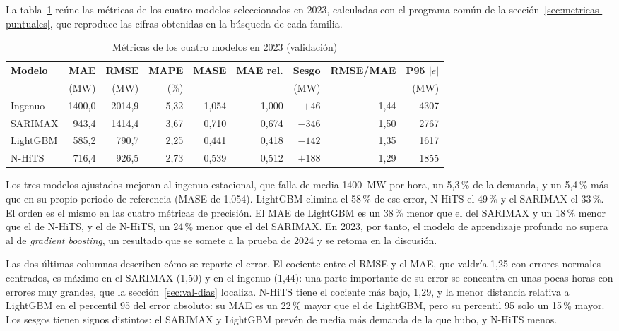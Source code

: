 La tabla~\ref{tab:validacion} reúne las métricas de los cuatro modelos
seleccionados en 2023, calculadas con el programa común de la
sección~\ref{sec:metricas-puntuales}, que reproduce las cifras obtenidas en
la búsqueda de cada familia.

\begin{table}[htbp]
	\centering
	\caption{Métricas de los cuatro modelos en 2023 (validación)}
	\label{tab:validacion}
	\small
	\setlength{\tabcolsep}{3.5pt}
	\begin{tabular}{lrrrrrrrr}
		\hline
		\textbf{Modelo} & \textbf{MAE} & \textbf{RMSE} & \textbf{MAPE} & \textbf{MASE} & \textbf{MAE rel.} & \textbf{Sesgo} & \textbf{RMSE/MAE} & \textbf{P95 $|e|$} \\
		 & (MW) & (MW) & (\%) & & & (MW) & & (MW) \\
		\hline
		Ingenuo & 1400,0 & 2014,9 & 5,32 & 1,054 & 1,000 & $+46$ & 1,44 & 4307 \\
		SARIMAX & 943,4 & 1414,4 & 3,67 & 0,710 & 0,674 & $-346$ & 1,50 & 2767 \\
		LightGBM & 585,2 & 790,7 & 2,25 & 0,441 & 0,418 & $-142$ & 1,35 & 1617 \\
		N-HiTS & 716,4 & 926,5 & 2,73 & 0,539 & 0,512 & $+188$ & 1,29 & 1855 \\
		\hline
	\end{tabular}
\end{table}

Los tres modelos ajustados mejoran al ingenuo estacional, que falla de media
1400~MW por hora, un 5,3\,\% de la demanda, y un 5,4\,\% más que en su
propio periodo de referencia (MASE de 1,054). LightGBM elimina el 58\,\% de
ese error, N-HiTS el 49\,\% y el SARIMAX el 33\,\%. El orden es el mismo en
las cuatro métricas de precisión. El MAE de LightGBM es un 38\,\% menor que el
del SARIMAX y un 18\,\% menor que el de N-HiTS, y el de N-HiTS, un 24\,\%
menor que el del SARIMAX. En 2023, por tanto, el
modelo de aprendizaje profundo no supera al de \textit{gradient boosting}, un
resultado que se somete a la prueba de 2024 y se retoma en la discusión.

Las dos últimas columnas describen cómo se reparte el error. El cociente
entre el RMSE y el MAE, que valdría 1,25 con errores normales centrados, es
máximo en el
SARIMAX (1,50) y en el ingenuo (1,44): una parte importante de su error se
concentra en unas pocas horas con errores muy grandes, que la
sección~\ref{sec:val-dias} localiza. N-HiTS tiene el cociente más bajo, 1,29,
y la menor distancia relativa a LightGBM en el percentil 95 del error absoluto:
su MAE es un 22\,\% mayor que el de LightGBM, pero su percentil 95 solo un
15\,\% mayor. Los sesgos tienen signos distintos: el SARIMAX y LightGBM
prevén de media más demanda de la que hubo, y N-HiTS menos.

